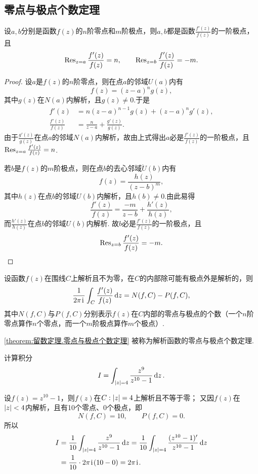 \subsection{零点与极点个数定理}
\begin{lemma}
设\(a,b\)分别是函数\(f(z)\)的\(n\)阶零点和\(m\)阶极点，则\(a,b\)都是函数\(\frac{f'(z)}{f(z)}\)的一阶极点，且\[
\operatorname{Res}_{z=a} \frac{f'(z)}{f(z)} = n,
\qquad
\operatorname{Res}_{z=b} \frac{f'(z)}{f(z)} = -m.
\]
\begin{proof}
设\(a\)是\(f(z)\)的\(n\)阶零点，则在点\(a\)的邻域\(U(a)\)内有\[
f(z) = (z-a)^n g(z),
\]其中\(g(z)\)在\(N(a)\)内解析，且\(g(z)\neq0\).于是\begin{align*}
f'(z) &= n(z-a)^{n-1} g(z) + (z-a)^n g'(z), \\
\frac{f'(z)}{f(z)} &= \frac{n}{z-a} + \frac{g'(z)}{g(z)}.
\end{align*}
由于\(\frac{g'(z)}{g(z)}\)在点\(a\)的邻域\(N(a)\)内解析，故由上式得出\(a\)必是\(\frac{f'(z)}{f(z)}\)的一阶极点，且\(\operatorname{Res}_{z=a} \frac{f'(z)}{f(z)} = n\).

若\(b\)是\(f(z)\)的\(m\)阶极点，则在点\(b\)的去心邻域\(\mathring{U}(b)\)内有\[
f(z) = \frac{h(z)}{(z-b)^m},
\]其中\(h(z)\)在点\(b\)的邻域\(U(b)\)内解析，且\(h(b)\neq0\).由此易得\[
\frac{f'(z)}{f(z)} = \frac{-m}{z-b} + \frac{h'(z)}{h(z)},
\]而\(\frac{h'(z)}{h(z)}\)在点\(b\)的邻域\(U(b)\)内解析.
故\(b\)必是\(\frac{f'(z)}{f(z)}\)的一阶极点，且\[
\operatorname{Res}_{z=b} \frac{f'(z)}{f(z)} = -m.
\qedhere
\]
\end{proof}
\end{lemma}

\begin{theorem}\label{theorem:留数定理.零点与极点个数定理}%
设函数\(f(z)\)在围线\(C\)上解析且不为零，在\(C\)的内部除可能有极点外是解析的，则\begin{equation}\label{equation:留数定理.零点与极点个数定理1}
\frac{1}{2\pi\kern1pt\mathrm{i}\kern1pt} \int_C \frac{f'(z)}{f(z)} \dd{z}
= N(f,C) - P(f,C),
\end{equation}
其中\(N(f,C)\)与\(P(f,C)\)分别表示\(f(z)\)在\(C\)内部的零点与极点的个数（一个\(n\)阶零点算作\(n\)个零点，而一个\(m\)阶极点算作\(m\)个极点）.
\end{theorem}
\cref{theorem:留数定理.零点与极点个数定理} 被称为解析函数的零点与极点个数定理.

\begin{example}
计算积分\[
I = \int_{\abs{z}=4} \frac{z^9}{z^{10}-1} \dd{z}.
\]
\begin{solution}
设\(f(z) = z^{10}-1\)，则\(f(z)\)在\(C: \abs{z}=4\)上解析且不等于零；
又因\(f(z)\)在\(\abs{z}<4\)内解析，且有10个零点、0个极点，即\[
N(f,C) = 10, \qquad P(f,C) = 0.
\]所以\begin{align*}
I &= \frac{1}{10} \int_{\abs{z}=4} \frac{z^9}{z^{10}-1} \dd{z}
= \frac{1}{10} \int_{\abs{z}=4} \frac{(z^{10}-1)'}{z^{10}-1} \dd{z} \\
&= \frac{1}{10} \cdot 2\pi\kern1pt\mathrm{i}\kern1pt (10-0) = 2\pi\kern1pt\mathrm{i}\kern1pt.
\end{align*}
\end{solution}
\end{example}

